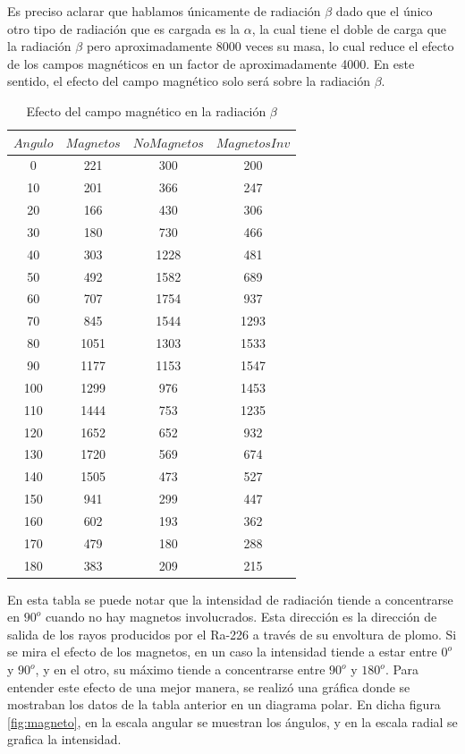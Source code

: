 \documentclass[%
 reprint,
 amsmath,amssymb,
 aps,
]{revtex4-1}
\begin{document}
Es preciso aclarar que hablamos únicamente de radiación $\beta$ dado que el único otro tipo de radiación que es cargada es la $\alpha$, la cual tiene el doble de carga que la radiación $\beta$ pero aproximadamente 8000 veces su masa, lo cual reduce el efecto de los campos magnéticos en un factor de aproximadamente 4000. En este sentido, el efecto del campo magnético solo será sobre la radiación $\beta$.\\

\begin{table}[h!]
\centering
 \begin{tabular}{|c|c|c|c|} 
 \hline
 $Angulo$& $Magnetos$ & $No Magnetos$ & $Magnetos Inv$ \\ [0.5ex] 
 \hline\hline
 0&221&300&200\\
10&201&366&247\\
20&166&430&306\\
30&180&730&466\\
40&303&1228&481\\
50&492&1582&689\\
60&707&1754&937\\
70&845&1544&1293\\
80&1051&1303&1533\\
90&1177&1153&1547\\
100&1299&976&1453\\
110&1444&753&1235\\
120&1652&652&932\\
130&1720&569&674\\
140&1505&473&527\\
150&941&299&447\\
160&602&193&362\\
170&479&180&288\\
180&383&209&215\\
[1ex] 
 \hline
 \end{tabular}
 \caption{Efecto del campo magnético en la radiación $\beta$}
 \label{table:beta}
\end{table} 

En esta tabla se puede notar que la intensidad de radiación tiende a concentrarse en $90^o$ cuando no hay magnetos involucrados. Esta dirección es la dirección de salida de los rayos producidos por el Ra-226 a través de su envoltura de plomo. Si se mira el efecto de los magnetos, en un caso la intensidad tiende a estar entre $0^o$ y $90^o$, y en el otro, su máximo tiende a concentrarse entre $90^o$ y $180^o$. Para entender este efecto de una mejor manera, se realizó una gráfica donde se mostraban los datos de la tabla anterior en un diagrama polar. En dicha figura \ref{fig:magneto}, en la escala angular se muestran los ángulos, y en la escala radial se grafica la intensidad.\\
\end{document}
